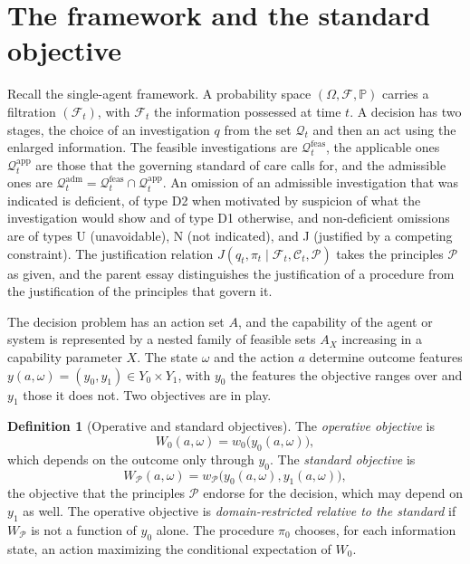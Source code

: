 \documentclass[11pt]{article}
\newcommand{\F}{\mathcal F}
\newcommand{\Q}{\mathcal Q}
\newcommand{\C}{\mathcal C}
\newcommand{\PP}{\mathbb P}
\newcommand{\feas}{\mathrm{feas}}
\newcommand{\adm}{\mathrm{adm}}
\newcommand{\app}{\mathrm{app}}
\theoremstyle{plain}
\theoremstyle{definition}
\newtheorem{definition}{Definition}
\begin{document}
\section{The framework and the standard objective}\label{sec:framework}

Recall the single-agent framework. A probability space $(\Omega,\F,\PP)$ carries a filtration $(\F_t)$, with $\F_t$ the information possessed at time $t$. A decision has two stages, the choice of an investigation $q$ from the set $\Q_t$ and then an act using the enlarged information. The feasible investigations are $\Q^{\feas}_t$, the applicable ones $\Q^{\app}_t$ are those that the governing standard of care calls for, and the admissible ones are $\Q^{\adm}_t=\Q^{\feas}_t\cap\Q^{\app}_t$. An omission of an admissible investigation that was indicated is deficient, of type D2 when motivated by suspicion of what the investigation would show and of type D1 otherwise, and non-deficient omissions are of types U (unavoidable), N (not indicated), and J (justified by a competing constraint). The justification relation $J(q_t,\pi_t\mid\F_t,\C_t,\mathcal P)$ takes the principles $\mathcal P$ as given, and the parent essay distinguishes the justification of a procedure from the justification of the principles that govern it.

The decision problem has an action set $A$, and the capability of the agent or system is represented by a nested family of feasible sets $A_X$ increasing in a capability parameter $X$. The state $\omega$ and the action $a$ determine outcome features $y(a,\omega)=(y_0,y_1)\in Y_0\times Y_1$, with $y_0$ the features the objective ranges over and $y_1$ those it does not. Two objectives are in play.

\begin{definition}[Operative and standard objectives]\label{def:objectives}
The \emph{operative objective} is
\[
W_0(a,\omega)=w_0\bigl(y_0(a,\omega)\bigr),
\]
which depends on the outcome only through $y_0$. The \emph{standard objective} is
\[
W_{\mathcal P}(a,\omega)=w_{\mathcal P}\bigl(y_0(a,\omega),y_1(a,\omega)\bigr),
\]
the objective that the principles $\mathcal P$ endorse for the decision, which may depend on $y_1$ as well. The operative objective is \emph{domain-restricted relative to the standard} if $W_{\mathcal P}$ is not a function of $y_0$ alone. The procedure $\pi_0$ chooses, for each information state, an action maximizing the conditional expectation of $W_0$.
\end{definition}
\end{document}
